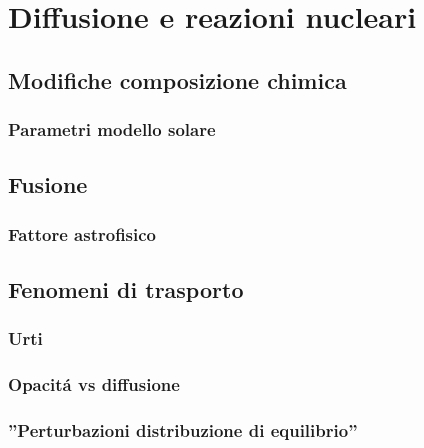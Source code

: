 \documentclass[../main.tex]{subfiles}
\begin{document}



\chapter{Diffusione e reazioni nucleari}





\cite{pit12kinetics}

\printbibliography[]

\section{Modifiche composizione chimica}

\subsection{Parametri modello solare}

\section{Fusione}

\subsection{Fattore astrofisico}

\section{Fenomeni di trasporto}

\subsection{Urti}

\subsection{Opacit\'a vs diffusione}

\subsection{''Perturbazioni distribuzione di equilibrio''}

\end{document}

